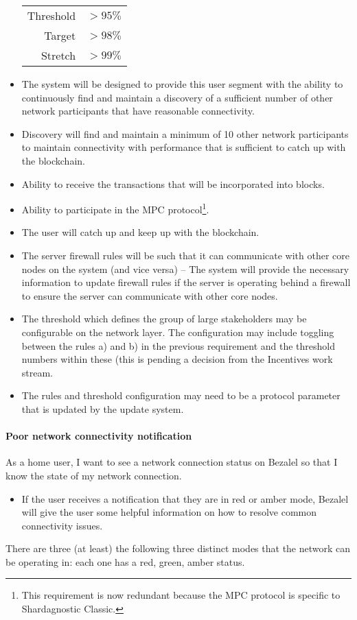 \begin{itemize}
      \begin{tabular}{rl}
      Threshold & $>95\%$ \\
      Target    & $>98\%$ \\
      Stretch   & $>99\%$
      \end{tabular}
\item The system will be designed to provide this user segment with the ability
      to continuously find and maintain a discovery of a sufficient number of
      other network participants that have reasonable connectivity.
\item Discovery will find and maintain a minimum of 10 other network
      participants to maintain connectivity with performance that is sufficient
      to catch up with the blockchain.
\item Ability to receive the transactions that will be incorporated into blocks.
\item Ability to participate in the MPC protocol\footnote{This requirement is
      now redundant because the MPC protocol is specific to Shardagnostic Classic.}.
\item The user will catch up and keep up with the blockchain.
\item The server firewall rules will be such that it can communicate with other
      core nodes on the system (and vice versa) -- The system will provide the
      necessary information to update firewall rules if the server is operating
      behind a firewall to ensure the server can communicate with other core
      nodes.
\item The threshold which defines the group of large stakeholders may be
      configurable on the network layer. The configuration may include toggling
      between the rules a) and b) in the previous requirement and the threshold
      numbers within these (this is pending a decision from the Incentives
      work stream.
\item The rules and threshold configuration may need to be a protocol parameter
      that is updated by the update system.
\end{itemize}


\paragraph{Poor network connectivity notification}

As a home user, I want to see a network connection status on Bezalel so that
I know the state of my network connection.
%
\begin{itemize}
\item If the user receives a notification that they are in red or amber mode,
      Bezalel will give the user some helpful information on how to resolve
      common connectivity issues.
\end{itemize}
%
There are three (at least) the following three distinct modes that the network can be operating in:
each one has a red, green, amber status.

